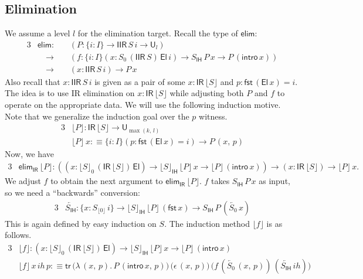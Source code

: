 \documentclass[acmsmall,screen,review,anonymous]{acmart}
\newcommand{\msf}[1]{{\mathsf{#1}}}
\newcommand{\U}{\msf{U}}
\newcommand{\El}{\msf{El}}
\newcommand{\IR}{\msf{IR}}
\newcommand{\ih}{{ih}}
\newcommand{\intro}{\msf{intro}}
\newcommand{\IH}{\msf{IH}}
\newcommand{\elim}{\msf{elim}}
\newcommand{\tr}{\msf{tr}}
\newcommand{\fst}{\msf{fst}}
\newcommand{\IIR}{\msf{IIR}}
\newcommand{\Sigr}[1]{\lfloor #1 \rfloor}
\newcommand{\floord}[1]{\lfloor #1 \rfloor}
\newcommand{\ola}[1]{\overleftarrow{#1}}
\begin{document}
\subsection{Elimination}\label{sec:iir-construction-elimination}

We assume a level $l$ for the elimination target. Recall the type of $\elim$:
\begin{alignat*}{3}
  &\elim :\,           &&(P : \{i : I\}\to \IIR\,S\,i \to \U_l)\\
  &                \quad\to && (f : \{i : I\}(x : S_0\,(\IIR\,S)\,\El\,i) \to S_\IH\,P\,x \to P\,(\intro\,x))\\
  &                \quad\to && (x : \IIR\,S\,i) \to P\,x
\end{alignat*}
Also recall that $x : \IIR\,S\,i$ is given as a pair of some $x : \IR\,\Sigr{S}$ and $p : \fst\,(\El\,x) = i$.
The idea is to use IR elimination on $x : \IR\,\floord{S}$ while adjusting both $P$ and $f$ to operate
on the appropriate data. We will use the following induction motive. Note that we generalize the induction goal
over the $p$ witness.
\begin{alignat*}{3}
  &\floord{P} : \IR\,\floord{S} \to \U_{\max(k,\,l)} \\
  &\floord{P}\,x :\equiv \{i : I\}(p : \fst\,(\El\,x) = i) \to P\,(x,\,p)
\end{alignat*}
Now, we have
\begin{alignat*}{3}
  & \elim_\IR\,\floord{P} : ((x : \floord{S}_0\,(\IR\,\floord{S})\,\El) \to \floord{S}_\IH\,\floord{P}\,x \to \floord{P}\,(\intro\,x))
       \to (x : \IR\,\floord{S}) \to \floord{P}\,x.
\end{alignat*}
We adjust $f$ to obtain the next argument to $\elim_\IR\,\floord{P}$. $f$ takes $S_\IH\,P\,x$ as input,
so we need a ``backwards'' conversion:
\begin{alignat*}{3}
  & \ola{S_\IH} : \{x : S_{\floord{0}}\,i\} \to \floord{S}_\IH\,\floord{P}\,(\fst\,x) \to S_\IH\,P\,(\ola{S_0}\,x)
\end{alignat*}
This is again defined by easy induction on $S$. The induction method $\floord{f}$ is as follows.
\begin{alignat*}{3}
  &\floord{f} : (x : \floord{S}_0\,(\IR\,\floord{S})\,\El) \to \floord{S}_\IH\,\floord{P}\,x \to \floord{P}\,(\intro\,x)\\
  &\floord{f}\,x\,\ih\,p :\equiv \tr\,\bigl(\lambda\,(x,\,p).\,P\,(\intro\,x,\,p)\bigr)\,\bigl(\epsilon\,(x,\,p)\bigr)\,
                                      \bigl(f\,(\ola{S_0}\,(x,\,p))\,(\ola{S_\IH}\,\ih)\bigr)
\end{alignat*}
\end{document}
